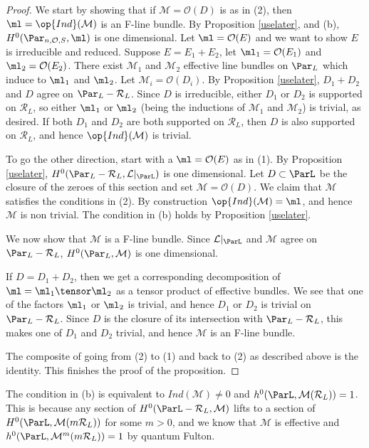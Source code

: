 \begin{proof}
We start by showing that if $\mathcal{M}=\mathcal{O}(D)$ is as in (2), then $\ml=\op{Ind}(\mathcal{M})$ is an F-line bundle.
By Proposition \ref{uselater}, and (b), $H^0(\Par_{n,\mathcal{O},S},\ml)$ is one dimensional. Let $\ml=
\mathcal{O}(E)$ and we want to show $E$ is irreducible and reduced. Suppose $E=E_1+E_2$, let $\ml_1=\mathcal{O}(E_1)$ and $\ml_2=\mathcal{O}(E_2)$. There exist $\mathcal{M}_1$ and $\mathcal{M}_2$ effective line bundles on $\Par_L$ which induce to $\ml_1$ and $\ml_2$. Let $\mathcal{M}_i=\mathcal{O}(D_i)$. By Proposition \ref{uselater}, $D_1+D_2$ and $D$ agree on $\Par_L-\mathcal{R}_L$. Since $D$ is irreducible, either $D_1$ or $D_2$ is supported on $\mathcal{R}_L$, so either $\ml_1$ or $\ml_2$ (being the inductions of $\mathcal{M}_1$ and $\mathcal{M}_2$) is trivial, as desired. If both $D_1$ and $D_2$ are both supported on  $\mathcal{R}_L$, then $D$ is also supported on $\mathcal{R}_L$, and hence $\op{Ind}(\mathcal{M})$ is trivial.

To go the other direction, start with a $\ml=\mathcal{O}(E)$ as in (1). By Proposition \ref{uselater}, $H^0(\Par_L-\mathcal{R}_L,\mathcal{L}|_{\ParL})$ is  one dimensional. Let ${D}\subset \ParL$ be the closure of the zeroes of this section and set $\mathcal{M}=\mathcal{O}(D)$.  We claim that $\mathcal{M}$ satisfies the conditions in (2). By construction $\op{Ind}(\mathcal{M})=\ml$, and hence $\mathcal{M}$ is non trivial. The condition in (b) holds by Proposition \ref{uselater}.

We now show that $\mathcal{M}$ is a F-line bundle. Since
$\mathcal{L}|_{\ParL}$ and $\mathcal{M}$ agree on $\Par_L-\mathcal{R}_L$, $H^0(\Par_L,\mathcal{M})$ is one dimensional.


If $D=D_1+D_2$, then we get a corresponding decomposition of $\ml=\ml_1\tensor\ml_2$ as a tensor product of effective bundles. We see that one of the factors $\ml_1$ or $\ml_2$ is trivial, and hence $D_1$ or $D_2$ is trivial on $\Par_L-\mathcal{R}_L$. Since $D$ is the closure of its intersection with $\Par_L-\mathcal{R}_L$, this makes one of $D_1$ and  $D_2$ trivial, and hence $\mathcal{M}$ is an F-line bundle.

The composite of going from (2) to (1) and back to (2) as described above is the identity. This finishes the proof of the proposition.


\end{proof}
\begin{remark}
\notready\label{putR}
The condition in (b) is equivalent to $Ind(\mathcal{M})\neq 0$ and $h^0(\ParL,\mathcal{M}(\mathcal{R}_L))=1$. This is because any section of $H^0(\ParL-\mathcal{R}_L,\mathcal{M})$ lifts to a section of
$H^0(\ParL,\mathcal{M}(m\mathcal{R}_L))$ for some $m>0$, and we know that $\mathcal{M}$ is effective and $h^0(\ParL,\mathcal{M}^m(m\mathcal{R}_L))=1$ by quantum Fulton.

\end{remark}
